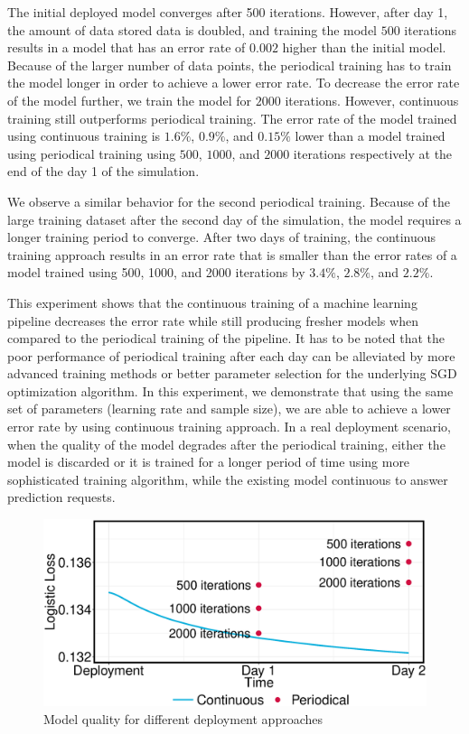 The initial deployed model converges after 500 iterations.
However, after day 1, the amount of data stored data is doubled, and training the model $500$ iterations results in a model that has an error rate of $0.002$ higher than the initial model.
Because of the larger number of data points, the periodical training has to train the model longer in order to achieve a lower error rate.
To decrease the error rate of the model further, we train the model for $2000$ iterations.
However, continuous training still outperforms periodical training.
The error rate of the model trained using continuous training is $1.6\%$, $0.9\%$, and $0.15\% $ lower than a model trained using periodical training using $500$, $1000$, and $2000$ iterations respectively at the end of the day 1 of the simulation.

We observe a similar behavior for the second periodical training.
Because of the large training dataset after the second day of the simulation, the model requires a longer training period to converge.
After two days of training, the continuous training approach results in an error rate that is smaller than the error rates of a model trained using 500, 1000, and 2000 iterations by $3.4\%$, $2.8\%$, and $2.2\%$.

This experiment shows that the continuous training of a machine learning pipeline decreases the error rate while still producing fresher models when compared to the periodical training of the pipeline.
It has to be noted that the poor performance of periodical training after each day can be alleviated by more advanced training methods or better parameter selection for the underlying SGD optimization algorithm.
In this experiment, we demonstrate that using the same set of parameters (learning rate and sample size), we are able to achieve a lower error rate by using continuous training approach.
In a real deployment scenario, when the quality of the model degrades after the periodical training, either the model is discarded or it is trained for a longer period of time using more sophisticated training algorithm, while the existing model continuous to answer prediction requests.


\begin{figure}[h!]
\centering
\includegraphics[width=\columnwidth]{../images/experiment-results/criteo-proactive-training-experiment.eps}
\caption{Model quality for different deployment approaches}
\label{fig:loss-proactive-vs-daily}
\vspace{2mm}
\end{figure}

